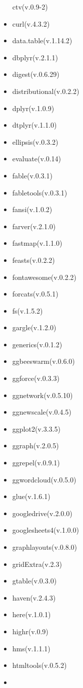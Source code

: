 \documentclass[
]{article}
\begin{document}
\begin{itemize}
  ctv(v.0.9-2)
\item
  curl(v.4.3.2)
\item
  data.table(v.1.14.2)
\item
  dbplyr(v.2.1.1)
\item
  digest(v.0.6.29)
\item
  distributional(v.0.2.2)
\item
  dplyr(v.1.0.9)
\item
  dtplyr(v.1.1.0)
\item
  ellipsis(v.0.3.2)
\item
  evaluate(v.0.14)
\item
  fable(v.0.3.1)
\item
  fabletools(v.0.3.1)
\item
  fansi(v.1.0.2)
\item
  farver(v.2.1.0)
\item
  fastmap(v.1.1.0)
\item
  feasts(v.0.2.2)
\item
  fontawesome(v.0.2.2)
\item
  forcats(v.0.5.1)
\item
  fs(v.1.5.2)
\item
  gargle(v.1.2.0)
\item
  generics(v.0.1.2)
\item
  ggbeeswarm(v.0.6.0)
\item
  ggforce(v.0.3.3)
\item
  ggnetwork(v.0.5.10)
\item
  ggnewscale(v.0.4.5)
\item
  ggplot2(v.3.3.5)
\item
  ggraph(v.2.0.5)
\item
  ggrepel(v.0.9.1)
\item
  ggwordcloud(v.0.5.0)
\item
  glue(v.1.6.1)
\item
  googledrive(v.2.0.0)
\item
  googlesheets4(v.1.0.0)
\item
  graphlayouts(v.0.8.0)
\item
  gridExtra(v.2.3)
\item
  gtable(v.0.3.0)
\item
  haven(v.2.4.3)
\item
  here(v.1.0.1)
\item
  highr(v.0.9)
\item
  hms(v.1.1.1)
\item
  htmltools(v.0.5.2)
\item

\end{itemize}
\end{document}
